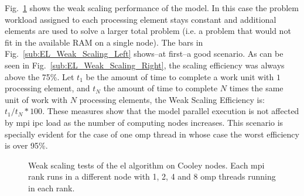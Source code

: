 \documentclass[10pt,journal,compsoc]{IEEEtran}
\begin{document}
Fig.~\ref{fig:EL_Weak_Scaling} shows the weak scaling performance of the model. In this case the problem workload assigned to each processing element stays constant and additional elements are used to solve a larger total problem (i.e. a problem that would not fit in the available RAM on a single node). The bars in Fig.~\ref{sub:EL_Weak_Scaling_Left} shows--at first--a good scenario. As can be seen in Fig.~\ref{sub:EL_Weak_Scaling_Right}, the scaling efficiency was always above the 75\%. Let $t_1$ be the amount of time to complete a work unit with $1$ processing element, and $t_N$ the amount of time to complete $N$ times the same unit of work with $N$ processing elements, the Weak Scaling Efficiency is: $t_1 / t_N * 100$. These measures show that the model parallel execution is not affected by \gls{mpi} \gls{ipc} load as the number of computing nodes increases. This scenario is specially evident for the case of one \gls{omp} thread in whose case the worst efficiency is over 95\%.

\begin{figure}[tb] 
    \centering
    \hfill

	\caption{Weak scaling tests of the \gls{el} algorithm on Cooley nodes. Each \gls{mpi} rank runs in a different node with 1, 2, 4 and 8 \gls{omp} threads running in each rank.}
  \label{fig:EL_Weak_Scaling} 
\end{figure}
\end{document}
